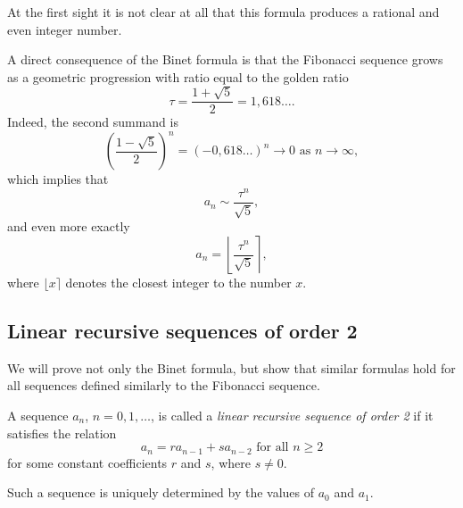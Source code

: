 \begin{page}


At the first sight it is not clear at all that this formula produces a rational and even integer number.

A direct consequence of the Binet formula is that the Fibonacci sequence grows as a geometric progression with ratio
equal to the golden ratio
\[
\tau = \frac{1+\sqrt{5}}2 = 1,618\ldots.
\]
Indeed, the second summand is
\[
\left(\frac{1-\sqrt{5}}2\right)^n = (-0,618\ldots)^n \to 0 \text{ as } n \to \infty,
\]
which implies that
\[
a_n \sim \frac{\tau^n}{\sqrt{5}},
\]
and even more exactly
\[
a_n = \left\lfloor \frac{\tau^n}{\sqrt{5}} \right\rceil,
\]
where $\lfloor x \rceil$ denotes the closest integer to the number $x$.



\end{page}

\begin{page}

\subsection{Linear recursive sequences of order 2}
We will prove not only the Binet formula, but show that similar formulas hold for all sequences defined similarly to the Fibonacci sequence.


\end{page}

\begin{page}

\begin{dfn}
A sequence $a_n$, $n = 0, 1, \ldots$, is called a \emph{linear recursive sequence of order 2} if
it satisfies the relation
\begin{equation}
\label{eqn:LinRec2}
a_n = ra_{n-1} + sa_{n-2} \text{ for all } n \ge 2
\end{equation}
for some constant coefficients $r$ and $s$, where $s \ne 0$.
\end{dfn}

\end{page}

\begin{page}

Such a sequence is uniquely determined by the values of $a_0$ and $a_1$.


\end{page}


